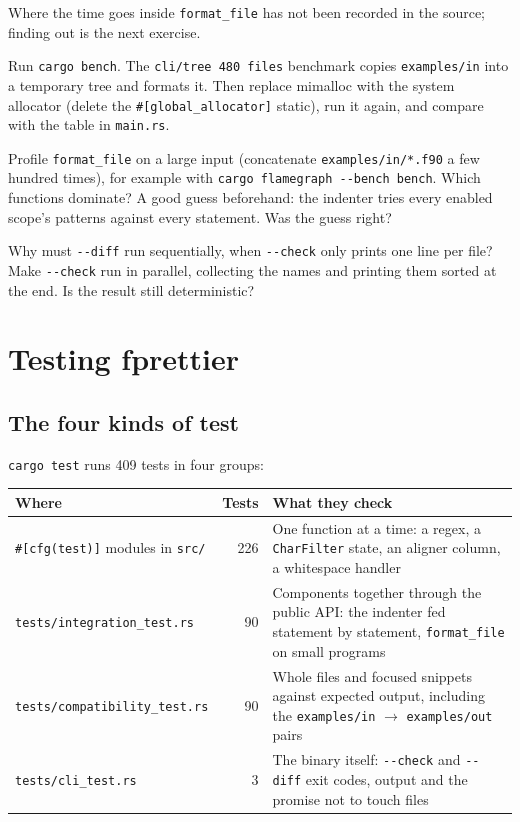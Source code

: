 \documentclass[11pt,a4paper,openany]{book}
\newcommand{\code}[1]{\texttt{\small #1}}
\newcommand{\file}[1]{\texttt{\small\color{accent}#1}}
\newcommand{\flag}[1]{\texttt{\small -{}-#1}}
\newcounter{exercise}[chapter]
\begin{document}
Where the time goes inside \code{format\_file} has not been recorded in the
source; finding out is the next exercise.

\begin{exercise}[Measure]
Run \code{cargo bench}. The \code{cli/tree 480 files} benchmark copies
\file{examples/in} into a temporary tree and formats it. Then replace mimalloc
with the system allocator (delete the \code{\#[global\_allocator]} static), run
it again, and compare with the table in \file{main.rs}.
\end{exercise}

\begin{exercise}[Profile]
Profile \code{format\_file} on a large input (concatenate
\file{examples/in/*.f90} a few hundred times), for example with
\code{cargo flamegraph -{}-bench bench}. Which functions dominate? A good
guess beforehand: the indenter tries every enabled scope's patterns against
every statement. Was the guess right?
\end{exercise}

\begin{exercise}
Why must \flag{diff} run sequentially, when \flag{check} only prints one line per
file? Make \flag{check} run in parallel, collecting the names and printing them
sorted at the end. Is the result still deterministic?
\end{exercise}
\chapter{Testing fprettier}\label{ch:testing}

\section{The four kinds of test}

\code{cargo test} runs 409 tests in four groups:

\begin{center}
\small
\begin{tabularx}{\linewidth}{@{}l r X@{}}
\toprule
Where & Tests & What they check\\
\midrule
\code{\#[cfg(test)]} modules in \file{src/} & 226 & One function at a time: a regex, a \code{CharFilter} state, an aligner column, a whitespace handler\\
\file{tests/integration\_test.rs} & 90 & Components together through the public API: the indenter fed statement by statement, \code{format\_file} on small programs\\
\file{tests/compatibility\_test.rs} & 90 & Whole files and focused snippets against expected output, including the \file{examples/in} $\to$ \file{examples/out} pairs\\
\file{tests/cli\_test.rs} & 3 & The binary itself: \flag{check} and \flag{diff} exit codes, output and the promise not to touch files\\
\bottomrule
\end{tabularx}
\end{center}
\end{document}
